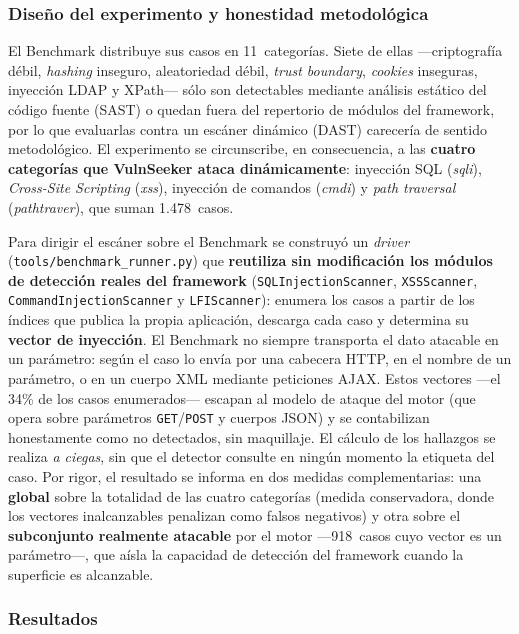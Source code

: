 \documentclass[12pt, a4paper]{article}
\begin{document}
\subsubsection{Diseño del experimento y honestidad metodológica}

El Benchmark distribuye sus casos en 11~categorías. Siete de ellas
---criptografía débil, \textit{hashing} inseguro, aleatoriedad débil,
\textit{trust boundary}, \textit{cookies} inseguras, inyección LDAP y XPath---
sólo son detectables mediante análisis estático del código fuente (SAST) o quedan
fuera del repertorio de módulos del framework, por lo que evaluarlas contra un
escáner dinámico (DAST) carecería de sentido metodológico. El experimento se
circunscribe, en consecuencia, a las \textbf{cuatro categorías que VulnSeeker
ataca dinámicamente}: inyección SQL (\textit{sqli}), \textit{Cross-Site Scripting}
(\textit{xss}), inyección de comandos (\textit{cmdi}) y \textit{path traversal}
(\textit{pathtraver}), que suman 1.478~casos.

Para dirigir el escáner sobre el Benchmark se construyó un \textit{driver}
(\texttt{tools/benchmark\_runner.py}) que \textbf{reutiliza sin modificación los
módulos de detección reales del framework} (\texttt{SQLInjectionScanner},
\texttt{XSSScanner}, \texttt{CommandInjectionScanner} y \texttt{LFIScanner}):
enumera los casos a partir de los índices que publica la propia aplicación,
descarga cada caso y determina su \textbf{vector de inyección}. El Benchmark no
siempre transporta el dato atacable en un parámetro: según el caso lo envía por
una cabecera HTTP, en el nombre de un parámetro, o en un cuerpo XML mediante
peticiones AJAX. Estos vectores ---el 34\% de los casos enumerados--- escapan al
modelo de ataque del motor (que opera sobre parámetros \texttt{GET}/\texttt{POST}
y cuerpos JSON) y se contabilizan honestamente como no detectados, sin maquillaje.
El cálculo de los hallazgos se realiza \textit{a ciegas}, sin que el detector
consulte en ningún momento la etiqueta del caso. Por rigor, el resultado se
informa en dos medidas complementarias: una \textbf{global} sobre la totalidad de
las cuatro categorías (medida conservadora, donde los vectores inalcanzables
penalizan como falsos negativos) y otra sobre el \textbf{subconjunto realmente
atacable} por el motor ---918~casos cuyo vector es un parámetro---, que aísla la
capacidad de detección del framework cuando la superficie es alcanzable.

\subsubsection{Resultados}
\end{document}
